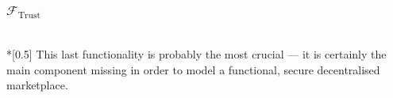 \subsubsection{$\mathcal{F}_{\mathrm{Trust}}$} \ \\*[0.5\baselineskip]
  This last functionality is probably the most crucial --- it is certainly the main
  component missing in order to model a functional, secure decentralised marketplace.
